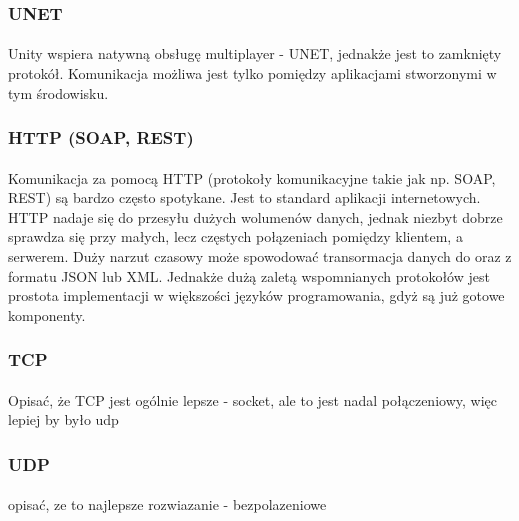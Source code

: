 \subsubsection{UNET}
\paragraph{}
Unity wspiera natywną obsługę multiplayer - UNET, jednakże jest to zamknięty protokół. Komunikacja możliwa jest tylko pomiędzy aplikacjami stworzonymi w tym środowisku.

\subsubsection{HTTP (SOAP, REST)}
\paragraph{}
Komunikacja za pomocą HTTP (protokoły komunikacyjne takie jak np. SOAP, REST) są bardzo często spotykane. Jest to standard aplikacji internetowych. HTTP nadaje się do przesyłu dużych wolumenów danych, jednak niezbyt dobrze sprawdza się przy małych, lecz częstych połązeniach pomiędzy klientem, a serwerem. Duży narzut czasowy może spowodować transormacja danych do oraz z formatu JSON lub XML. Jednakże dużą zaletą wspomnianych protokołów jest prostota implementacji w większości języków programowania, gdyż są już gotowe komponenty.
\subsubsection{TCP}
\paragraph{}
{\color{red}Opisać, że TCP jest ogólnie lepsze - socket, ale to jest nadal połączeniowy, więc lepiej by było udp}
\subsubsection{UDP}
\paragraph{}
{\color{red}opisać, ze to najlepsze rozwiazanie - bezpolazeniowe}
